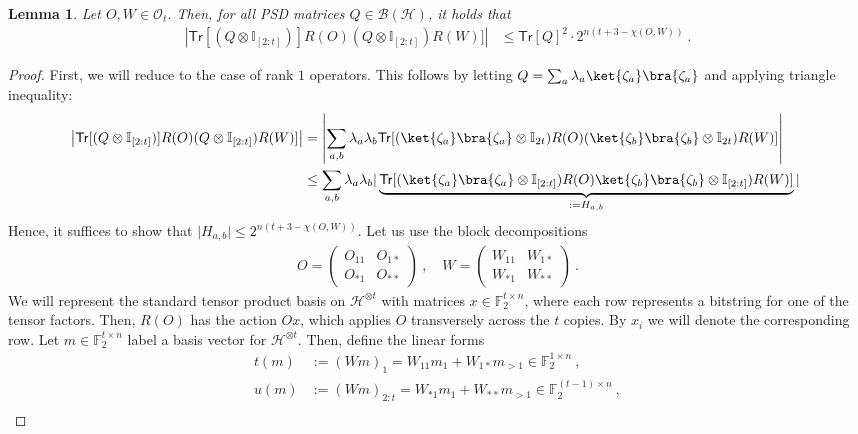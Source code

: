 \documentclass[11pt]{article}
\newtheorem{lemma}[theorem]{Lemma}
\newcommand{\id}{\ensuremath{\mathbb{I}}}
\newcommand{\Tr}{\mathsf{Tr}}
\newcommand{\F}{\mathbb{F}}
\newcommand{\Oc}{\mathcal{O}}
\newcommand{\Hc}{\mathcal{H}}
\begin{document}
\begin{lemma}\label{lem:cross_term}
    Let $O,W\in \Oc_t$. Then, for all PSD matrices $Q \in \mathcal{B}(\Hc)$, it holds that
    \begin{align}
        \left\vert \Tr[(Q\otimes \id_{[2:t]})] R(O) (Q\otimes \id_{[2:t]}) R(W)]\right\vert & \leq \Tr[Q]^2\cdot  2^{n(t+3-\chi(O,W))}\ .
    \end{align}
\end{lemma}
\begin{proof}
     First, we will reduce to the case of rank $1$ operators. This follows by letting $Q = \sum_{a} \lambda_a \ket{\zeta_a}\bra{\zeta_a}$ and applying triangle inequality:
    \begin{align}
        \left\vert \Tr[(Q\otimes \id_{[2:t]})] R(O) (Q\otimes \id_{[2:t]}) R(W)]\right\vert & = \left\vert \sum_{a,b} \lambda_a \lambda_b \Tr[(\ket{\zeta_a}\bra{\zeta_a} \otimes \id_{2{t}}) R(O) (\ket{\zeta_b}\bra{\zeta_b} \otimes \id_{2{t}}) R(W)] \right\vert\\
        & \leq \sum_{a,b}\lambda_a \lambda_b \vert \underbrace{\Tr[(\ket{\zeta_a}\bra{\zeta_a}\otimes \id_{[2:t]})R(O)\ket{\zeta_b}\bra{\zeta_b}\otimes \id_{[2:t]}) R(W)]}_{:=H_{a,b}}\vert \ 
    \end{align}
 Hence, it suffices to show that $\vert H_{a,b}\vert \leq 2^{n(t+3-\chi(O,W))}$. Let us use the block decompositions
    \begin{align}
        O  = \begin{pmatrix}
            O_{11} & O_{1*}\\
            O_{*1} & O_{**}
        \end{pmatrix}\ , \quad W = \begin{pmatrix}
            W_{11} & W_{1*}\\
            W_{*1} & W_{**}
        \end{pmatrix}\ .
    \end{align}
We will represent the standard tensor product basis on $\Hc^{\otimes t}$ with matrices $x \in \F_2^{t \times n}$, where each row represents a bitstring for one of the tensor factors. Then, $R(O)$ has the action $Ox$, which applies $O$ transversely across the $t$ copies. By $x_i$ we will denote the corresponding row. Let $m\in \F_2^{t\times n}$ label a basis vector for $\Hc^{\otimes t}$. Then, define the linear forms
\begin{align}
    t(m) & := (Wm)_1 = W_{11}m_1 + W_{1*}m_{>1}\in \F_2^{1 \times n}\ , \\
    u(m) & := (Wm)_{2:t} = W_{*1}m_1 + W_{**}m_{>1} \in \F_2^{(t-1) \times n} \ , \\

\end{align}
\end{proof}
\end{document}
